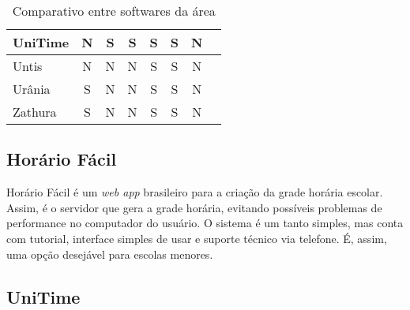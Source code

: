 \documentclass{subfiles}
\begin{document}
\begin{table}[htb]
\begin{center}
{\begin{threeparttable}
\begin{tabular}{| l | c | c | c | c | c | c | c | }
				UniTime  			& N & S & S & S & S & N \\\hline%
				Untis 	 			& N & N & N & S & S & N \\\hline%
				Urânia 		   	 	& S & N & N & S & S & N \\\hline%
				Zathura				& S & N & N & S & S & N \\\hline%
			\end{tabular}
			\caption{Comparativo entre softwares da área}
			\label{table:softwares}
		\end{threeparttable}
		}
	\end{center}
\end{table}

\subsection{Horário Fácil}

	\par Horário Fácil é um \textit{web app} brasileiro para a criação da grade horária escolar. Assim, é o servidor que gera a grade horária, evitando possíveis problemas de performance no computador do usuário. O sistema é um tanto simples, mas conta com tutorial, interface simples de usar e suporte técnico via telefone. É, assim, uma opção desejável para escolas menores.

\subsection{UniTime}
\end{document}
